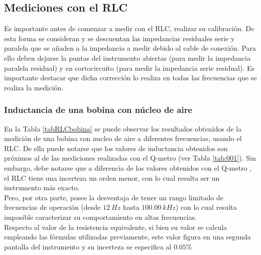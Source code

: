 \documentclass[a4paper,10pt]{article}
\begin{document}
	\subsection{Mediciones con el RLC}		
		\indent Es importante antes de comenzar a medir con el RLC, realizar su 
		calibraci\'on. De esta forma se consideran y se descuentan las 
		impedancias residuales serie y paralela que se a\~naden a la impedancia 
		a medir debido al cable de conexión. Para ello deben dejarse la puntas 
		del instrumento abiertas (para medir la impedancia paralela residual) y 
		en cortocircuito (para medir la impedancia serie residual). Es 
		importante destacar que dicha corrección lo realiza en todas las 
		frecuencias que se realiza la medición.

		\subsubsection{Inductancia de una bobina con n\'ucleo de aire}
		
		\indent En la Tabla \ref{tabRLCbobina} se puede observar los resultados 
		obtenidos de la medici\'on de una bobina con nucleo de aire a diferentes
		frecuencias, usando el RLC. De ella puede notarse que los valores de 
		inductancia obtenidos son pr\'oximos al de las mediciones realizadas con
		el Q-metro (ver Tabla \ref{tab:001}). Sin embargo, debe notarse que a 
		diferencia de los valores obtenidos con el Q-metro , el RLC tiene una 
		incerteza un orden menor, con lo cual resulta ser un instrumento m\'as 
		exacto. \\
		\indent Pero, por otra parte, posee la desventaja de tener un rango 
		limitado de frecuencias de operaci\'on (desde $12~Hz$ hasta 
		$100.00~kHz$) con lo cual resulta imposible caracterizar su 
		comportamiento en altas frecuencias. \\
		\indent Respecto al valor de la resistencia equivalente, si bien su 
		valor se calcula empleando las f\'ormulas utilizadas previamente, este 
		valor figura en una segunda pantalla del instrumento y su incerteza se 
		especifica al $0.05\%$
		
\end{document}
